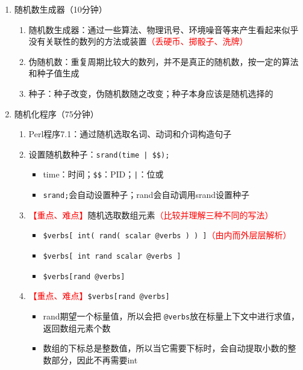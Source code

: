 \documentclass{TIJMUjiaoanLL}
\begin{document}
\begin{enumerate}
\begin{enumerate}
    \end{enumerate}
  \item 随机数生成器（10分钟）
    \begin{enumerate}
      \item 随机数生成器：通过一些算法、物理讯号、环境噪音等来产生看起来似乎没有关联性的数列的方法或装置\textcolor{red}{（丢硬币、掷骰子、洗牌）}
      \item 伪随机数：重复周期比较大的数列，并不是真正的随机数，按一定的算法和种子值生成
      \item 种子：种子改变，伪随机数随之改变；种子本身应该是随机选择的
    \end{enumerate}
  \item 随机化程序（75分钟）
    \begin{enumerate}
      \item Perl程序7.1：通过随机选取名词、动词和介词构造句子
      \item 设置随机数种子：\verb=srand(time | $$);=
	\begin{itemize}
	  \item time：时间；\verb|$$|：PID；\verb=|=：位或
	  \item \verb|srand;|会自动设置种子；rand会自动调用srand设置种子
	\end{itemize}
      \item \textcolor{red}{【重点、难点】}随机选取数组元素\textcolor{red}{（比较并理解三种不同的写法）}
	\begin{itemize}
	  \item \verb|$verbs[ int( rand( scalar @verbs ) ) ]|\textcolor{red}{（由内而外层层解析）}
	  \item \verb|$verbs[ int rand scalar @verbs ]|
	  \item \verb|$verbs[rand @verbs]|
	\end{itemize}
      \item \textcolor{red}{【重点、难点】}\verb|$verbs[rand @verbs]|
	\begin{itemize}
	  \item rand期望一个标量值，所以会把 \verb|@verbs|放在标量上下文中进行求值，返回数组元素个数
	  \item 数组的下标总是整数值，所以当它需要下标时，会自动提取小数的整数部分，因此不再需要int
	\end{itemize}
    \end{enumerate}

\otherTail
\newpage
\otherHeader


\end{enumerate}
\end{document}
